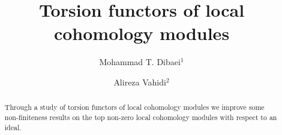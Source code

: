 \documentclass[10pt]{amsart}
\begin{document}




\title[Torsion functors of local cohomology modules]
 {Torsion functors of local cohomology modules}









     \author[M. T. Dibaei]{Mohammad T. Dibaei$^{1}$}
     \author[A. Vahidi]{Alireza Vahidi$^{2}$}


\address{$^{1}$ Faculty of Mathematical Sciences and Computer, Tarbiat Moallem University, Tehran, Iran; and
School of Mathematics, Institute for Research in Fundamental
Sciences (IPM), P.O. Box: 19395-5746, Tehran, Iran.}

\address{$^{2}$ Payame Noor University (PNU), Iran.}











\begin{abstract}
Through a study of torsion functors of local cohomology modules
we improve some non-finiteness results on the top non-zero local
cohomology modules with respect to an ideal.
\end{abstract}
\end{document}

